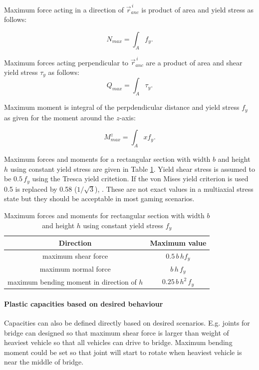 \documentclass{jcgt}
\begin{document}
Maximum force acting in a direction of $\vec{r}_{anc}^{\,i} $
is product of area and yield stress as follows:

\begin{equation} \label{eq:fN}
N_{max}= \int_A f_y.
\end{equation}

Maximum forces acting perpendicular to $\vec{r}_{anc}^{\,i} $
are a product of area and shear yield stress $\tau_y$ as follows:
\begin{equation} \label{eq:fQ}
Q_{max}= \int_A \tau_y.
\end{equation}

Maximum moment is integral of the perpdendicular distance 
and yield stress $f_y$ as given for the moment around  the $z$-axis:

\begin{equation} \label{eq:Mz}
M_{max}^z= \int_A x f_y.
\end{equation}


Maximum forces and moments for a
rectangular section with width $b$ and height $h$ using constant yield stress
are given in Table \ref{tab:maxForces}.
Yield shear stress is assumed to be $ 0.5\, f_y$ using the Tresca yield critetion.
If the von Mises yield criterion is used 0.5 is replaced by 0.58 ($1/\sqrt{3}$), \cite{dowling}.
These are not exact values in a multiaxial stress state but they
should be acceptable in most gaming scenarios.

\begin {table}
\small
\begin{center}
\begin{tabular}{| c| c|}
\hline
{\bf Direction} & {\bf Maximum value}  \\ \hline
maximum shear force & $0.5\, b\, h f_y$ \\ \hline
maximum normal force & $b\, h\, f_y$  \\ \hline
maximum bending moment in direction of $h$& $0.25\, b\, h^2 \, f_y$  \\ \hline
\end{tabular}
\end{center}
\caption{Maximum forces and moments for 
rectangular section with width $b$ and height $h$ using constant yield stress $f_y$}
\label{tab:maxForces} 
\end {table}

\paragraph{Plastic capacities based on desired behaviour}
Capacities can also be defined directly based on desired scenarios.
E.g. joints for bridge can designed so that maximum shear force is larger than
weight of heaviest vehicle so that all vehicles can drive to bridge. Maximum 
bending moment could be set so that joint will start to rotate when heaviest vehicle is
near the middle of bridge.
\end{document}
